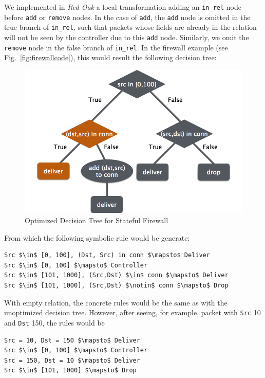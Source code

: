 \documentclass[nocopyrightspace]{sigplanconf}
\begin{document}
We implemented in \textit{Red Oak} a local transformation adding an \lstinline|in_rel| node before \lstinline|add| or \lstinline|remove| nodes. In the case of \lstinline|add|, the \lstinline|add| node is omitted in the true branch of \lstinline|in_rel|, such that packets whose fields are already in the relation will not be seen by the controller due to this \lstinline|add| node. Similarly, we omit the \lstinline|remove| node in the false branch of \lstinline|in_rel|. In the firewall example (see Fig.~\ref{fig:firewallcode}), this would result the following decision tree:

\begin{figure}[ht]
  \includegraphics[scale=.33]{img/optdtree.png}
\caption{Optimized Decision Tree for Stateful Firewall}     
\label{fig:decisiontreeopt}  
  \end{figure}


From which the following symbolic rule would be generate:
\begin{lstlisting}[mathescape]
Src $\in$ [0, 100], (Dst, Src) in conn $\mapsto$ Deliver
Src $\in$ [0, 100] $\mapsto$ Controller
Src $\in$ [101, 1000], (Src,Dst) $\in$ conn $\mapsto$ Deliver
Src $\in$ [101, 1000], (Src,Dst) $\notin$ conn $\mapsto$ Drop
\end{lstlisting}

With empty relation, the concrete rules would be the same as with the unoptimized decision tree. However, after seeing, for example, packet with \lstinline|Src| 10 and \lstinline|Dst| 150, the rules would be
\begin{lstlisting}[mathescape]
Src = 10, Dst = 150 $\mapsto$ Deliver  
Src $\in$ [0, 100] $\mapsto$ Controller  
Src = 150, Dst = 10 $\mapsto$ Deliver  
Src $\in$ [101, 1000] $\mapsto$ Drop  
\end{lstlisting}
\end{document}
